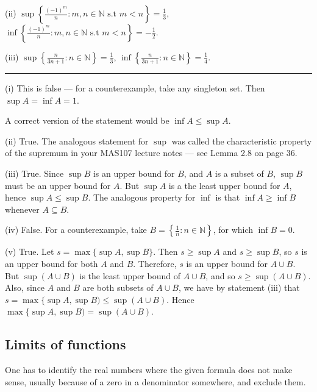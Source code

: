 \documentclass[letterpaper,10pt,english]{jupyterBook}
\begin{document}
\sphinxAtStartPar
(ii) \(\displaystyle\sup\left\{\frac{(-1)^m}{n}:m,n\in\mathbb{N} \text{ s.t } m<n\right\}=\frac{1}{3}\), \(\displaystyle\inf\left\{\frac{(-1)^m}{n}:m,n\in\mathbb{N} \text{ s.t } m<n\right\}=-\frac{1}{2}\).

\sphinxAtStartPar
(iii) \(\displaystyle\sup\left\{\frac{n}{3n + 1} :n\in\mathbb{N}\right\}=\frac{1}{3}\), \(\displaystyle\inf\left\{\frac{n}{3n + 1} :n\in\mathbb{N}\right\}=\frac{1}{4}\).


\bigskip\hrule\bigskip


\sphinxAtStartPar
{\hyperref[\detokenize{Problems:p7}]{}}(i) This is false — for a counter\sphinxhyphen{}example, take any singleton set. Then \(\sup A=\inf A=1\).

\sphinxAtStartPar
A correct version of the statement would be \(\inf A \leq \sup A\).

\sphinxAtStartPar
(ii) True. The analogous statement for \(\sup\) was called the characteristic property of the supremum in your MAS107 lecture notes — see Lemma 2.8 on page 36.

\sphinxAtStartPar
(iii) True. Since \(\sup B\) is an upper bound for \(B\), and \(A\) is a subset of \(B\), \(\sup B\) must be an upper bound for \(A\). But \(\sup A\) is a the least upper bound for \(A\), hence \(\sup A\leq \sup B\). The analogous property for \(\inf\) is that \(\inf A\geq\inf B\) whenever \(A\subseteq B\).

\sphinxAtStartPar
(iv) False. For a counter\sphinxhyphen{}example, take \(B=\left\{\frac{1}{n}:n\in\mathbb{N}\right\}\), for which \(\inf B=0\).

\sphinxAtStartPar
(v) True. Let \(s=\max\{\sup A,\sup B\}\). Then \(s\geq \sup A\) and \(s\geq \sup B\), so \(s\) is an upper bound for both \(A\) and \(B\). Therefore, \(s\) is an upper bound for \(A\cup B\). But \(\sup(A\cup B)\) is the least upper bound of \(A\cup B\), and so \(s\geq\sup(A\cup B)\). Also, since \(A\) and \(B\) are both subsets of \(A\cup B\), we have by statement (iii) that \(s=\max\{\sup A,\sup B)\leq\sup(A\cup B)\). Hence \(\max\{\sup A,\sup B)=\sup(A\cup B)\).


\subsection{Limits of functions}
\label{\detokenize{Solutions-full:limits-of-functions}}\label{\detokenize{Solutions-full:ch2sol}}
\sphinxAtStartPar
{\hyperref[\detokenize{Problems:id1}]{}} One has to identify the real numbers where the given formula does not make sense, usually because of a zero in a denominator somewhere, and exclude them.
\end{document}
